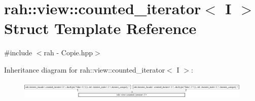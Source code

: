 \hypertarget{structrah_1_1view_1_1counted__iterator}{}\section{rah\+::view\+::counted\+\_\+iterator$<$ I $>$ Struct Template Reference}
\label{structrah_1_1view_1_1counted__iterator}


{\ttfamily \#include $<$rah -\/ Copie.\+hpp$>$}

Inheritance diagram for rah\+::view\+::counted\+\_\+iterator$<$ I $>$\+:\begin{figure}[H]
\begin{center}
\leavevmode
\includegraphics[height=0.868217cm]{structrah_1_1view_1_1counted__iterator}
\end{center}
\end{figure}
